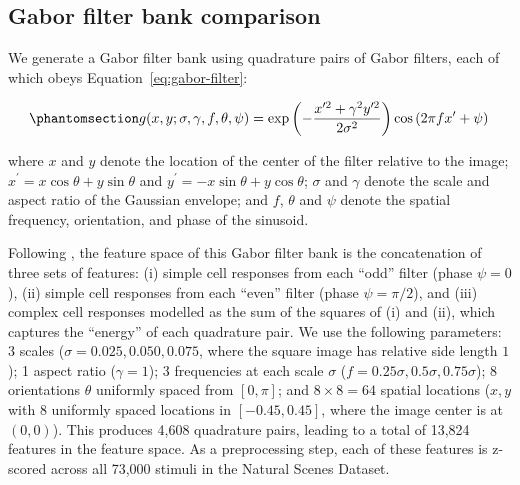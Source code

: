\documentclass[10pt]{article}
\begin{document}
\subsection{Gabor filter bank comparison}\label{gabor-filter-bank-comparison}

We generate a Gabor filter bank using quadrature pairs of Gabor filters, each of which obeys Equation~\ref{eq:gabor-filter}:

\begin{equation}\phantomsection\label{eq:gabor-filter}{
g(x, y; \sigma, \gamma, f, \theta, \psi) = \exp{\left(- \frac{x^{\prime 2} + \gamma^2 y^{\prime 2}}{2 \sigma^2}\right)} \cos{\left(2 \pi f x^\prime + \psi\right)}\,
}\end{equation}

where \(x\) and \(y\) denote the location of the center of the filter relative to the image; \(x^\prime = x \cos \theta + y \sin \theta\) and \(y^\prime = - x \sin \theta + y \cos \theta\); \(\sigma\) and \(\gamma\) denote the scale and aspect ratio of the Gaussian envelope; and \(f\), \(\theta\) and \(\psi\) denote the spatial frequency, orientation, and phase of the sinusoid.

Following \textcite{Cadena2019}, the feature space of this Gabor filter bank is the concatenation of three sets of features: (i) simple cell responses from each ``odd'' filter (phase \(\psi = 0\)), (ii) simple cell responses from each ``even'' filter (phase \(\psi = \pi / 2\)), and (iii) complex cell responses modelled as the sum of the squares of (i) and (ii), which captures the ``energy'' of each quadrature pair. We use the following parameters: 3 scales (\(\sigma = 0.025, 0.050, 0.075\), where the square image has relative side length \(1\)); 1 aspect ratio (\(\gamma = 1\)); 3 frequencies at each scale \(\sigma\) (\(f = 0.25 \sigma, 0.5 \sigma, 0.75 \sigma\)); 8 orientations \(\theta\) uniformly spaced from \([0, \pi]\); and \(8 \times 8 = 64\) spatial locations (\(x, y\) with 8 uniformly spaced locations in \([-0.45, 0.45]\), where the image center is at \((0, 0)\)). This produces 4,608 quadrature pairs, leading to a total of 13,824 features in the feature space. As a preprocessing step, each of these features is z-scored across all 73,000 stimuli in the Natural Scenes Dataset.
\end{document}
